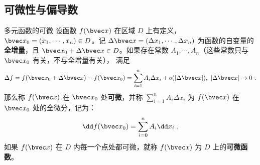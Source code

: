 \subsection{可微性与偏导数}
\begin{definition}{多元函数的可微}
设函数 $f(\bvec x)$ 在区域 $D$ 上有定义，$\bvec x_0=(x_1,\cdots,x_n)\in D$。记 $\Delta \bvec x=(\Delta x_1,\cdots,\Delta x_n)$ 为函数的自变量的\textbf{全增量}，且 $\bvec x_0+\Delta\bvec x\in D$。如果存在常数 $A_1,\cdots,A_n$（这些常数只与 $\bvec x_0$ 有关，不与全增量有关），
满足
\begin{equation}
\Delta f=f(\bvec x_0+\Delta \bvec x)-f(\bvec x_0)=\sum_{i=1}^n A_i \Delta x_i+o(|\Delta \bvec x|),\ |\Delta \bvec x|\rightarrow 0~.
\end{equation}
那么称 $f(\bvec x)$ 在 $\bvec x_0$ 处\textbf{可微}，并称 $\sum_{i=1}^n A_i \Delta x_i$ 为 $f(\bvec x)$ 在 $\bvec x_0$ 处的全微分，记为：
\begin{equation}
\dd f(\bvec x_0)=\sum_{i=0}^n A_i\dd x_i~,
\end{equation}
如果 $f(\bvec x)$ 在 $D$ 内每一个点处都可微，就称 $f(\bvec x)$ 为 $D$ 上的\textbf{可微函数}。
\end{definition}